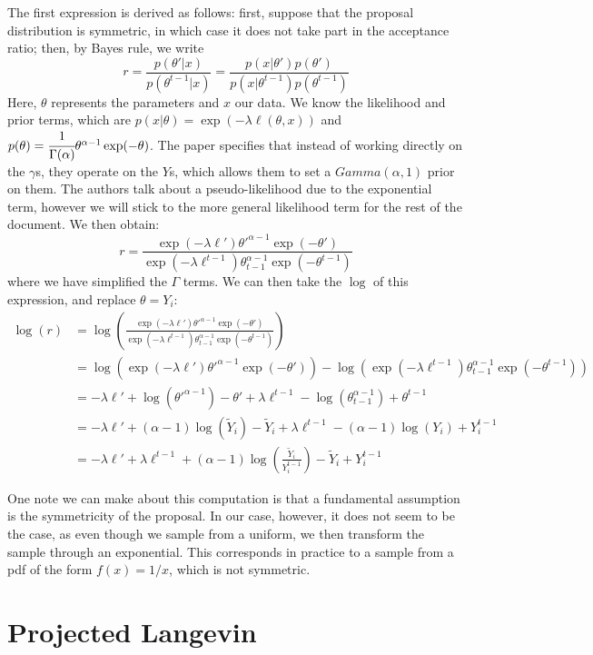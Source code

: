 \documentclass[12pt]{memoir}
\begin{document}
The first expression is derived as follows: first, suppose that the proposal distribution is symmetric, in which case it does not take part in the acceptance ratio; then, by Bayes rule, we write
$$
r = \frac{p(\theta'|x)}{p(\theta^{t-1}|x)} = \frac{p(x|\theta') p(\theta')}{p(x|\theta^{t-1})p(\theta^{t-1})}
$$
Here, $\theta$ represents the parameters and $x$ our data. We know the likelihood and prior terms, which are $p(x|\theta) = \exp(-\lambda \ell(\theta, x))$ and $p(\theta) = \cfrac{1}{\Gamma(\alpha)}\theta^{\alpha - 1} \exp(-\theta)$. The paper specifies that instead of working directly on the $\gamma$s, they operate on the $Y$s, which allows them to set a $Gamma(\alpha, 1)$ prior on them. The authors talk about a pseudo-likelihood due to the exponential term, however we will stick to the more general likelihood term for the rest of the document. We then obtain:
$$
r = \frac{\exp(-\lambda \ell') \theta'^{\alpha - 1} \exp(-\theta')}{\exp(-\lambda \ell^{t-1}) \theta_{t-1}^{\alpha - 1} \exp(-\theta^{t-1})}
$$
where we have simplified the $\Gamma$ terms. We can then take the $\log$ of this expression, and replace $\theta = Y_i$:
\begin{align*}
\log(r) &= \log \left( \frac{\exp(-\lambda \ell') \theta'^{\alpha - 1} \exp(-\theta')}{\exp(-\lambda \ell^{t-1}) \theta_{t-1}^{\alpha - 1} \exp(-\theta^{t-1})}\right)\\
&= \log(\exp(-\lambda \ell') \theta'^{\alpha - 1} \exp(-\theta')) - \log(\exp(-\lambda \ell^{t-1}) \theta_{t-1}^{\alpha - 1} \exp(-\theta^{t-1}))\\
&= -\lambda \ell' + \log(\theta'^{\alpha - 1}) - \theta' + \lambda \ell^{t-1} - \log(\theta_{t-1}^{\alpha - 1}) + \theta^{t-1}\\
&= -\lambda \ell' + (\alpha - 1) \log(\tilde Y_i) - \tilde Y_i + \lambda \ell^{t-1} - (\alpha - 1) \log(Y_i) + Y_i^{t-1}\\
&= -\lambda \ell' + \lambda \ell^{t-1} + (\alpha - 1) \log\left(\frac{\tilde Y_i}{Y_i^{t-1}} \right) - \tilde Y_i + Y_i^{t-1}
\end{align*}

One note we can make about this computation is that a fundamental assumption is the symmetricity of the proposal. In our case, however, it does not seem to be the case, as even though we sample from a uniform, we then transform the sample through an exponential. This corresponds in practice to a sample from a pdf of the form $f(x) = 1/x$, which is not symmetric.

\section{Projected Langevin}
\end{document}
